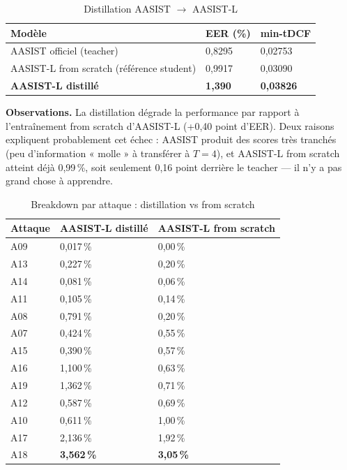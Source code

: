 \documentclass[10pt, a4paper]{article}
\begin{document}
\begin{table}[H]
\centering\small
\caption{Distillation AASIST $\rightarrow$ AASIST-L}
\begin{tabular}{@{}lll@{}}
\toprule
Modèle & EER (\%) & min-tDCF \\
\midrule
AASIST officiel (teacher) & 0,8295 & 0,02753 \\
\midrule
AASIST-L from scratch (référence student) & 0,9917 & 0,03090 \\
\textbf{AASIST-L distillé} & \textbf{1,390} & \textbf{0,03826} \\
\bottomrule
\end{tabular}
\end{table}

\noindent\textbf{Observations.} La distillation dégrade la performance par rapport à l'entraînement from scratch d'AASIST-L (+0,40 point d'EER). Deux raisons expliquent probablement cet échec : AASIST produit des scores très tranchés (peu d'information « molle » à transférer à $T=4$), et AASIST-L from scratch atteint déjà 0,99\,\%, soit seulement 0,16 point derrière le teacher — il n'y a pas grand chose à apprendre.

\begin{table}[H]
\centering\small
\caption{Breakdown par attaque : distillation vs from scratch}
\begin{tabular}{@{}lll@{}}
\toprule
Attaque & AASIST-L distillé & AASIST-L from scratch \\
\midrule
A09 & 0,017\,\% & 0,00\,\% \\
A13 & 0,227\,\% & 0,20\,\% \\
A14 & 0,081\,\% & 0,06\,\% \\
A11 & 0,105\,\% & 0,14\,\% \\
A08 & 0,791\,\% & 0,20\,\% \\
A07 & 0,424\,\% & 0,55\,\% \\
A15 & 0,390\,\% & 0,57\,\% \\
A16 & 1,100\,\% & 0,63\,\% \\
A19 & 1,362\,\% & 0,71\,\% \\
A12 & 0,587\,\% & 0,69\,\% \\
A10 & 0,611\,\% & 1,00\,\% \\
A17 & 2,136\,\% & 1,92\,\% \\
A18 & \textbf{3,562\,\%} & \textbf{3,05\,\%} \\
\bottomrule
\end{tabular}
\end{table}
\end{document}
